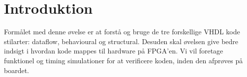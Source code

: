 \section{Introduktion}

Formålet med denne øvelse er at forstå og bruge de tre forskellige VHDL kode
stilarter: dataflow, behavioural og structural. Desuden skal øvelsen give bedre
indsigt i hvordan kode mappes til hardware på FPGA'en. Vi vil foretage
funktionel og timing simulationer for at verificere koden, inden den afprøves på
boardet.
